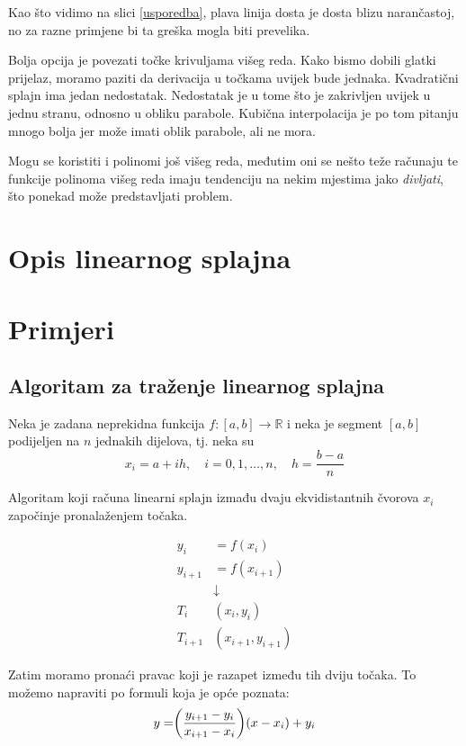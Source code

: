 \documentclass[12pt,a4paper]{report}
\begin{document}
	Kao što vidimo na slici \ref{usporedba}, plava linija dosta je dosta blizu narančastoj, no za razne primjene bi ta greška mogla biti prevelika.
	
	Bolja opcija je povezati točke krivuljama višeg reda. Kako bismo dobili glatki prijelaz, moramo paziti da derivacija u točkama uvijek bude jednaka. Kvadratični splajn ima jedan nedostatak. Nedostatak je u tome što je zakrivljen uvijek u jednu stranu, odnosno u obliku parabole. Kubična interpolacija je po tom pitanju mnogo bolja jer može imati oblik parabole, ali ne mora. 
	
	Mogu se koristiti i polinomi još višeg reda, međutim oni se nešto teže računaju te funkcije polinoma višeg reda imaju tendenciju na nekim mjestima jako \textit{divljati}, što ponekad može predstavljati problem.
	\section{Opis linearnog splajna}
	
	\section{Primjeri}
		\subsection{Algoritam za traženje linearnog splajna}
		Neka je zadana neprekidna funkcija $f:[a,b]\rightarrow \mathbb{R} $ i neka je segment $[a,b]$ podijeljen na $n$ jednakih dijelova, tj. neka su
		\begin{equation*}
			x_i=a+ih,\quad i=0,1,\ldots,n,\quad h=\frac{b-a}{n}
		\end{equation*}
		
		Algoritam koji računa linearni splajn izmađu dvaju ekvidistantnih čvorova $x_i$ započinje pronalaženjem točaka.
		
		\begin{align*}
			y_i&=f(x_i)\\
			y_{i+1}&=f(x_{i+1})\\
			&\downarrow\\
			T_i&(x_i, y_i)\\
			T_{i+1}&(x_{i+1}, y_{i+1})
		\end{align*}
		
		Zatim moramo pronaći pravac koji je razapet između tih dviju točaka. To možemo napraviti po formuli koja je opće poznata:
		\begin{equation}
		y=\biggr{(}\frac{y_{i+1}-y_i}{x_{i+1}-x_i}\biggr{)}(x-x_i)+y_i
		\label{pravac}
		\end{equation}
		
\end{document}
